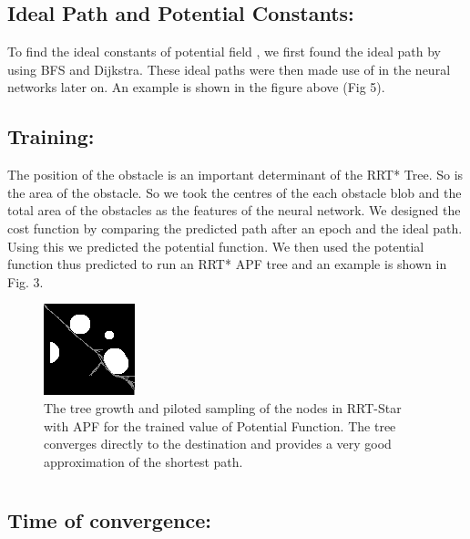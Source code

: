 \documentclass[runningheads]{llncs}
\begin{document}
\subsection{Ideal Path and Potential Constants:}
To find the ideal constants of potential field , we first found the ideal path by using BFS and Dijkstra. These ideal paths were then made use of in the neural networks later on. An example is shown in the figure above (Fig 5).


\subsection{Training:}
The position of the obstacle is an important determinant of the RRT* Tree. So is the area of the obstacle. So we took the centres of the each obstacle blob and the total area of the obstacles as the features of the neural network. We designed the cost function by comparing the predicted path after an epoch and the ideal path. Using this we predicted the potential function. We then used the potential function thus predicted to run an RRT* APF tree and an example is shown in Fig. 3.
\vspace{10mm}
\begin{figure}
\begin{center}
\includegraphics[scale=1.5]{img_bam.png}
    \caption{ The tree growth and piloted sampling of the nodes in RRT-Star with APF for the trained value of Potential Function. The tree converges directly to the destination and provides a very good approximation of the shortest path.} \label{fig1}
\end{center}
\end{figure}

\section{}
\subsection{Time of convergence:}
\end{document}
